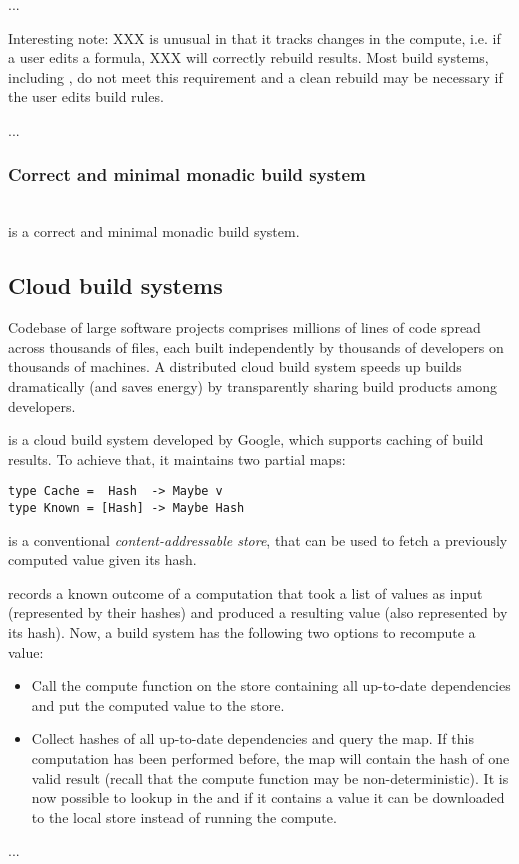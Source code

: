 ...

Interesting note: XXX is unusual in that it tracks changes in the compute,
i.e. if a user edits a formula, XXX will correctly rebuild results. Most build
systems, including \Shake, do not meet this requirement and a clean rebuild may
be necessary if the user edits build rules.

...

\subsubsection{Correct and minimal monadic build system}~\\

\Shake is a correct and minimal monadic build system.

\subsection{Cloud build systems}

Codebase of large software projects comprises millions of lines of code spread
across thousands of files, each built independently by thousands of developers
on thousands of machines. A distributed cloud build system speeds up builds
dramatically (and saves energy) by transparently sharing build products among
developers.


\Bazel is a cloud build system developed by Google, which supports caching of
build results. To achieve that, it maintains two partial maps:

\begin{verbatim}
type Cache =  Hash  -> Maybe v
type Known = [Hash] -> Maybe Hash
\end{verbatim}

 is a conventional \emph{content-addressable store}, that can be used
to fetch a previously computed value given its hash.

 records a known outcome of a computation that took a list of values
as input (represented by their hashes) and produced a resulting value (also
represented by its hash). Now, a build system has the following two options to
recompute a value:

\begin{itemize}
    \item Call the compute function on the store containing all up-to-date
    dependencies and put the computed value to the store.
    \item Collect hashes of all up-to-date dependencies  and query the
     map. If this computation has been performed before, the map will
    contain the hash  of one valid result (recall that the compute function
    may be non-deterministic). It is now possible to lookup  in the
     and if it contains a value  it can be downloaded to the
    local store instead of running the compute.
\end{itemize}

...

